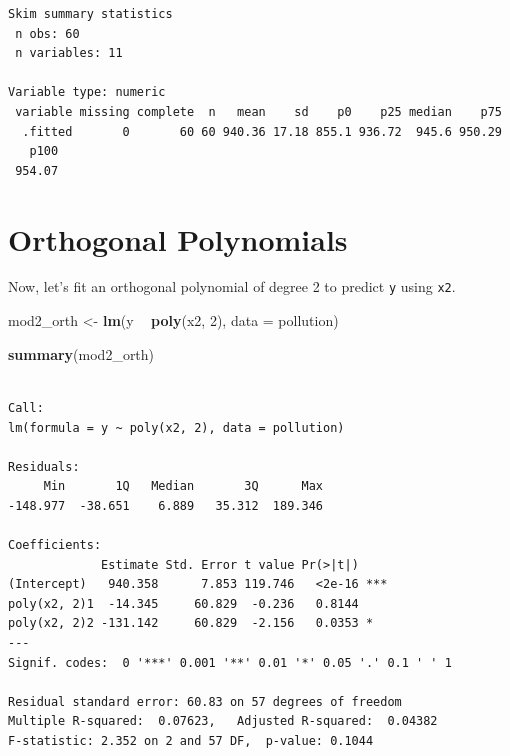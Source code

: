\documentclass[]{book}
\newenvironment{Shaded}{\begin{snugshade}}{\end{snugshade}}
\newcommand{\KeywordTok}[1]{\textcolor[rgb]{0.13,0.29,0.53}{\textbf{#1}}}
\newcommand{\DataTypeTok}[1]{\textcolor[rgb]{0.13,0.29,0.53}{#1}}
\newcommand{\DecValTok}[1]{\textcolor[rgb]{0.00,0.00,0.81}{#1}}
\newcommand{\StringTok}[1]{\textcolor[rgb]{0.31,0.60,0.02}{#1}}
\newcommand{\OperatorTok}[1]{\textcolor[rgb]{0.81,0.36,0.00}{\textbf{#1}}}
\newcommand{\NormalTok}[1]{#1}
\theoremstyle{definition}
\theoremstyle{definition}
\theoremstyle{definition}
\theoremstyle{remark}
\begin{document}
\begin{Shaded}
\end{Shaded}

\begin{verbatim}
Skim summary statistics
 n obs: 60 
 n variables: 11 

Variable type: numeric 
 variable missing complete  n   mean    sd    p0    p25 median    p75
  .fitted       0       60 60 940.36 17.18 855.1 936.72  945.6 950.29
   p100
 954.07
\end{verbatim}

\section{Orthogonal Polynomials}\label{orthogonal-polynomials}

Now, let's fit an orthogonal polynomial of degree 2 to predict
\texttt{y} using \texttt{x2}.

\begin{Shaded}
\begin{Highlighting}[]
\NormalTok{mod2_orth <-}\StringTok{ }\KeywordTok{lm}\NormalTok{(y }\OperatorTok{~}\StringTok{ }\KeywordTok{poly}\NormalTok{(x2, }\DecValTok{2}\NormalTok{), }\DataTypeTok{data =}\NormalTok{ pollution)}

\KeywordTok{summary}\NormalTok{(mod2_orth)}
\end{Highlighting}
\end{Shaded}

\begin{verbatim}

Call:
lm(formula = y ~ poly(x2, 2), data = pollution)

Residuals:
     Min       1Q   Median       3Q      Max 
-148.977  -38.651    6.889   35.312  189.346 

Coefficients:
             Estimate Std. Error t value Pr(>|t|)    
(Intercept)   940.358      7.853 119.746   <2e-16 ***
poly(x2, 2)1  -14.345     60.829  -0.236   0.8144    
poly(x2, 2)2 -131.142     60.829  -2.156   0.0353 *  
---
Signif. codes:  0 '***' 0.001 '**' 0.01 '*' 0.05 '.' 0.1 ' ' 1

Residual standard error: 60.83 on 57 degrees of freedom
Multiple R-squared:  0.07623,   Adjusted R-squared:  0.04382 
F-statistic: 2.352 on 2 and 57 DF,  p-value: 0.1044
\end{verbatim}
\end{document}
